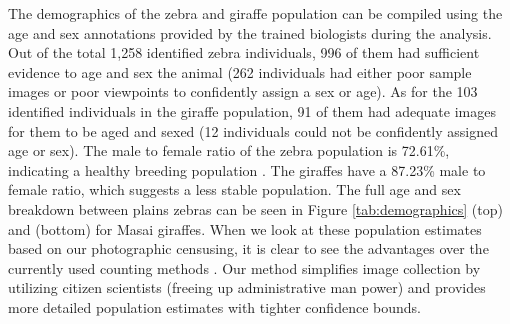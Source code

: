 \begin{table}[!htb]
\end{table}

The demographics of the zebra and giraffe population can be compiled using the age and sex annotations provided by the trained biologists during the analysis.  Out of the total 1,258 identified zebra individuals, 996 of them had sufficient evidence to age and sex the animal (262 individuals had either poor sample images or poor viewpoints to confidently assign a sex or age).  As for the 103 identified individuals in the giraffe population, 91 of them had adequate images for them to be aged and sexed (12 individuals could not be confidently assigned age or sex).  The male to female ratio of the zebra population is 72.61\%, indicating a healthy breeding population \cite{hack_status_2002}.  The giraffes have a  87.23\% male to female ratio, which suggests a less stable population. %
The full age and sex breakdown between plains zebras can be seen in Figure \ref{tab:demographics} (top) and (bottom) for Masai giraffes.  When we look at these population estimates based on our photographic censusing, it is clear to see the advantages over the currently used counting methods \cite{ogutu_changing_2013}.  Our method simplifies image collection by utilizing citizen scientists (freeing up administrative man power) and provides more detailed population estimates with tighter confidence bounds.

